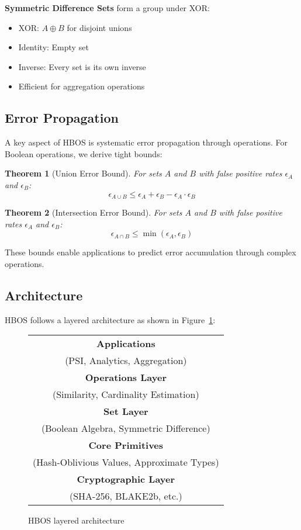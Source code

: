 \documentclass[10pt,conference]{IEEEtran}
\newtheorem{theorem}{Theorem}
\begin{document}
\textbf{Symmetric Difference Sets} form a group under XOR:
\begin{itemize}
\item XOR: $A \oplus B$ for disjoint unions
\item Identity: Empty set
\item Inverse: Every set is its own inverse
\item Efficient for aggregation operations
\end{itemize}

\subsection{Error Propagation}

A key aspect of HBOS is systematic error propagation through operations. For Boolean operations, we derive tight bounds:

\begin{theorem}[Union Error Bound]
For sets $A$ and $B$ with false positive rates $\epsilon_A$ and $\epsilon_B$:
$$\epsilon_{A \cup B} \leq \epsilon_A + \epsilon_B - \epsilon_A \cdot \epsilon_B$$
\end{theorem}

\begin{theorem}[Intersection Error Bound]
For sets $A$ and $B$ with false positive rates $\epsilon_A$ and $\epsilon_B$:
$$\epsilon_{A \cap B} \leq \min(\epsilon_A, \epsilon_B)$$
\end{theorem}

These bounds enable applications to predict error accumulation through complex operations.

\subsection{Architecture}

HBOS follows a layered architecture as shown in Figure~\ref{fig:architecture}:

\begin{figure}[h]
\centering
\begin{tabular}{|c|}
\hline
\textbf{Applications} \\
(PSI, Analytics, Aggregation) \\
\hline
\textbf{Operations Layer} \\
(Similarity, Cardinality Estimation) \\
\hline
\textbf{Set Layer} \\
(Boolean Algebra, Symmetric Difference) \\
\hline
\textbf{Core Primitives} \\
(Hash-Oblivious Values, Approximate Types) \\
\hline
\textbf{Cryptographic Layer} \\
(SHA-256, BLAKE2b, etc.) \\
\hline
\end{tabular}
\caption{HBOS layered architecture}
\label{fig:architecture}
\end{figure}
\end{document}
